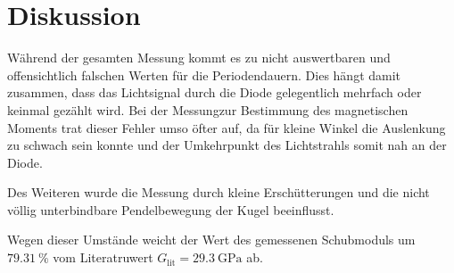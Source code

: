 \section{Diskussion}
\label{sec:Diskussion}

Während der gesamten Messung kommt es zu nicht auswertbaren
und offensichtlich falschen Werten für die Periodendauern.
Dies hängt damit zusammen, dass das Lichtsignal durch die Diode 
gelegentlich mehrfach oder keinmal gezählt wird. Bei der Messungzur Bestimmung
des magnetischen Moments trat dieser Fehler umso öfter auf, da für kleine 
Winkel die Auslenkung zu schwach sein konnte und der Umkehrpunkt des Lichtstrahls
somit nah an der Diode. 

Des Weiteren wurde die Messung durch kleine Erschütterungen und die nicht völlig
unterbindbare Pendelbewegung der Kugel beeinflusst. 

Wegen dieser Umstände weicht der Wert des gemessenen Schubmoduls um $\SI{79.31}{\percent}$
vom Literatruwert $ G_\text{lit} = \SI{29.3}{\giga\pascal}$ ab.
